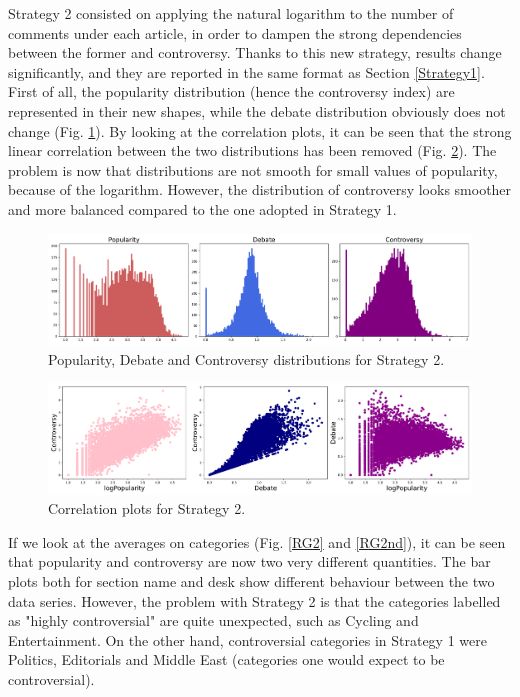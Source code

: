Strategy 2 consisted on applying the natural logarithm to the number of comments under each article, in order to dampen the strong dependencies between the former and controversy. Thanks to this new strategy, results change significantly, and they are reported in the same format as Section \ref{Strategy1}.
First of all, the popularity distribution (hence the controversy index) are represented in their new shapes, while the debate distribution obviously does not change (Fig. \ref{Str2Dist}).
By looking at the correlation plots, it can be seen that the strong linear correlation between the two distributions has been removed (Fig. \ref{Str2Corr}). The problem is now that distributions are not smooth for small values of popularity, because of the logarithm. However, the distribution of controversy looks smoother and more balanced compared to the one adopted in Strategy 1.

\begin{figure}[h]
\centering
\includegraphics[width=\tw]{Pictures/Strat2Dist.pdf}
\caption{Popularity, Debate and Controversy distributions for Strategy 2.}
\label{Str2Dist}
\end{figure}


\begin{figure}[h]
\centering
\includegraphics[width=\tw]{Pictures/Strat2Corr.pdf}
\caption{Correlation plots for Strategy 2.}
\label{Str2Corr}
\end{figure}


If we look at the averages on categories (Fig. \ref{RG2} and \ref{RG2nd}), it can be seen that popularity and controversy are now two very different quantities. The bar plots both for section name and desk show different behaviour between the two data series. However, the problem with Strategy 2 is that the categories labelled as "highly controversial" are quite unexpected, such as Cycling and Entertainment. On the other hand, controversial categories in Strategy 1 were Politics, Editorials and Middle East (categories one would expect to be controversial).

